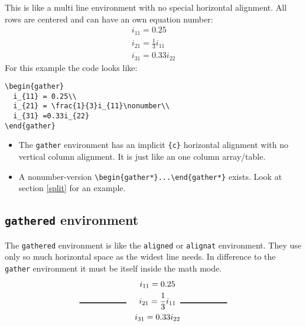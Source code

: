 \begin{table}[htb]
This is like a multi line environment with no special horizontal alignment.
All rows are centered and can have an own equation number:
%
\begin{gather}
i_{11}=0.25\\
i_{21}=\frac{1}{3}i_{11}\nonumber \\
i_{31}=0.33i_{22}
\end{gather}
%
For this example the code looks like:
\begin{lstlisting}
\begin{gather}
  i_{11} = 0.25\\
  i_{21} = \frac{1}{3}i_{11}\nonumber\\
  i_{31} =0.33i_{22}
\end{gather}
\end{lstlisting}

\begin{itemize}
\item The \texttt{gather} environment has an implicit \texttt{\{c\}}
horizontal alignment with no vertical column alignment. It is just
like an one column array/table.
\item A nonumber-version \texttt{\small \textbackslash{}begin\{gather{*}\}...\textbackslash{}end\{gather{*}\}}
exists.
Look at section \vref{split} for an example.
\end{itemize}

\subsection{\texttt{gathered} environment}

The \verb+gathered+ environment is like the \verb+aligned+ or \verb+alignat+
environment. They use only so much horizontal space as the widest line needs.
In difference to the \verb+gather+ environment it must be itself inside the
math mode.
%
\begin{align}
\rule{2cm}{1pt}
\begin{gathered}
\quad i_{11}=0.25\\
\quad i_{21}=\frac{1}{3}i_{11}\\
\quad i_{31}=0.33i_{22}
\end{gathered}
\rule{2cm}{1pt}
\end{align}


\end{table}
